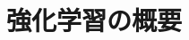 \documentclass[../../topic_machine-learning]{subfiles}
\begin{document}
\chapter{強化学習の概要}


\end{document}
